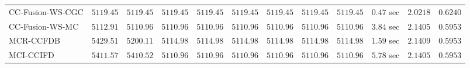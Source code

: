 \begin{table}[H]
\begin{tabular}{lrrrrrrrrrrr}
    CC-Fusion-WS-CGC & $      5119.45$ & $      5119.45$ & $      5119.45$ & $      5119.45$ & $      5119.45$ & $      5119.45$ & $      5119.45$ & $      5119.45$ & $         0.47$ sec    & $       2.0218$  & $       0.6240$ \\ 
     CC-Fusion-WS-MC & $      5112.91$ & $      5110.96$ & $      5110.96$ & $      5110.96$ & $      5110.96$ & $      5110.96$ & $      5110.96$ & $      5110.96$ & $         3.84$ sec    & $       2.1405$  & $       0.5953$ \\ 
\cmidrule{1-1} 
           MCR-CCFDB & $      5429.51$ & $      5200.11$ & $      5114.98$ & $      5114.98$ & $      5114.98$ & $      5114.98$ & $      5114.98$ & $      5114.98$ & $         1.59$ sec    & $       2.1409$  & $       0.5953$ \\ 
\cmidrule{1-1} 
           MCI-CCIFD & $      5411.57$ & $      5410.52$ & $      5110.96$ & $      5110.96$ & $      5110.96$ & $      5110.96$ & $      5110.96$ & $      5110.96$ & $         5.78$ sec    & $       2.1405$  & $       0.5953$ \\ 
\bottomrule
\end{tabular}
\end{table}

